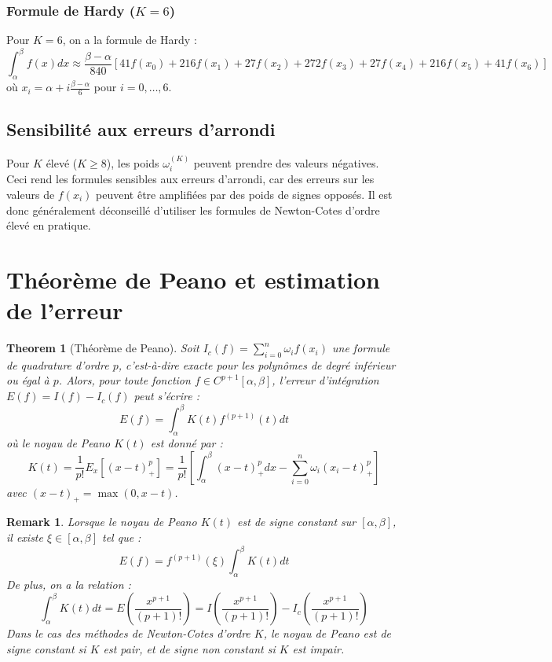 \documentclass{article}
\newtheorem{theorem}{Theorem}
\newtheorem{remark}{Remark}
\begin{document}
\subsubsection{Formule de Hardy ($K=6$)}

Pour $K=6$, on a la formule de Hardy :
\[
\int_{\alpha}^{\beta} f(x) dx \approx \frac{\beta - \alpha}{840} \left[ 41f(x_0) + 216f(x_1) + 27f(x_2) + 272f(x_3) + 27f(x_4) + 216f(x_5) + 41f(x_6) \right]
\]
où $x_i = \alpha + i \frac{\beta-\alpha}{6}$ pour $i=0, \dots, 6$.

\subsection{Sensibilité aux erreurs d'arrondi}

Pour $K$ élevé ($K \geq 8$), les poids $\omega_i^{(K)}$ peuvent prendre des valeurs négatives. Ceci rend les formules sensibles aux erreurs d'arrondi, car des erreurs sur les valeurs de $f(x_i)$ peuvent être amplifiées par des poids de signes opposés.  Il est donc généralement déconseillé d'utiliser les formules de Newton-Cotes d'ordre élevé en pratique.

\section{Théorème de Peano et estimation de l'erreur}

\begin{theorem}[Théorème de Peano]
Soit $I_c(f) = \sum_{i=0}^{n} \omega_i f(x_i)$ une formule de quadrature d'ordre $p$, c'est-à-dire exacte pour les polynômes de degré inférieur ou égal à $p$. Alors, pour toute fonction $f \in C^{p+1}[\alpha, \beta]$, l'erreur d'intégration $E(f) = I(f) - I_c(f)$ peut s'écrire :
\[
E(f) = \int_{\alpha}^{\beta} K(t) f^{(p+1)}(t) dt
\]
où le noyau de Peano $K(t)$ est donné par :
\[
K(t) = \frac{1}{p!} E_x[(x-t)_+^p] = \frac{1}{p!} \left[ \int_{\alpha}^{\beta} (x-t)_+^p dx - \sum_{i=0}^{n} \omega_i (x_i-t)_+^p \right]
\]
avec $(x-t)_+ = \max(0, x-t)$.
\end{theorem}

\begin{remark}
Lorsque le noyau de Peano $K(t)$ est de signe constant sur $[\alpha, \beta]$, il existe $\xi \in [\alpha, \beta]$ tel que :
\[
E(f) = f^{(p+1)}(\xi) \int_{\alpha}^{\beta} K(t) dt
\]
De plus, on a la relation :
\[
\int_{\alpha}^{\beta} K(t) dt = E\left(\frac{x^{p+1}}{(p+1)!}\right) = I\left(\frac{x^{p+1}}{(p+1)!}\right) - I_c\left(\frac{x^{p+1}}{(p+1)!}\right)
\]
Dans le cas des méthodes de Newton-Cotes d'ordre $K$, le noyau de Peano est de signe constant si $K$ est pair, et de signe non constant si $K$ est impair.
\end{remark}
\end{document}
